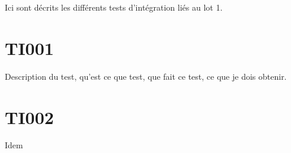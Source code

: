 Ici sont décrits les différents tests d'intégration liés au lot 1.

\section{TI001}
	Description du test, qu'est ce que test, que fait ce test, ce que je dois obtenir.
	
\section{TI002}
	Idem